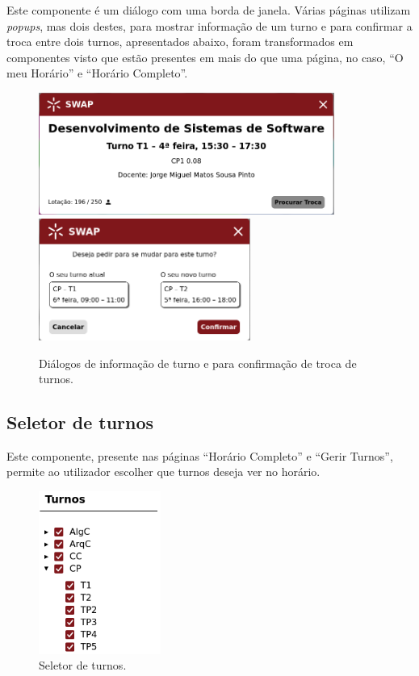 \documentclass[12pt, a4paper]{article}
\begin{document}
Este componente é um diálogo com uma borda de janela. Várias páginas utilizam \emph{popups}, mas
dois destes, para mostrar informação de um turno e para confirmar a troca entre dois turnos,
apresentados abaixo, foram transformados em componentes visto que estão presentes em mais do que uma
página, no caso, ``O meu Horário'' e ``Horário Completo''.

\begin{figure}[H]
    \centering
    \includegraphics[height=4cm]{res/components/popup-1.png}
    \includegraphics[height=4cm]{res/components/popup-2.png}
    \caption{Diálogos de informação de turno e para confirmação de troca de turnos.}
    \label{popup}
\end{figure}

\subsection{Seletor de turnos}

Este componente, presente nas páginas ``Horário Completo'' e ``Gerir Turnos'', permite ao utilizador
escolher que turnos deseja ver no horário.

\begin{figure}[H]
    \centering
    \includegraphics[width=4cm]{res/components/shift-selector.png}
    \caption{Seletor de turnos.}
    \label{shift-selector}
\end{figure}
\end{document}
